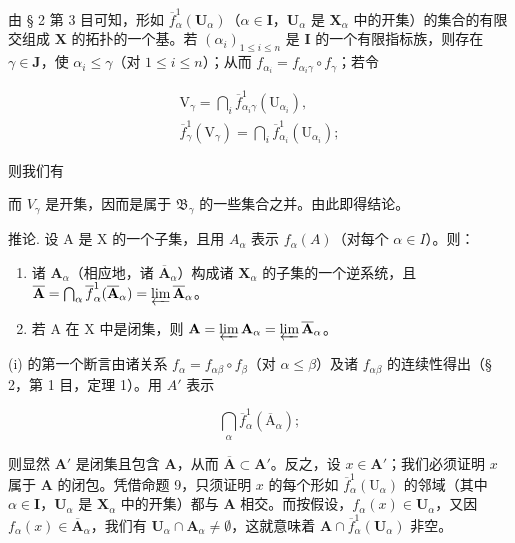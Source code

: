 由 § 2 第 3 目可知，形如 \(\overline{f}_{\alpha}^{1}(\mathbf{U}_{\alpha})\)（\(\alpha \in \mathbf{I}\)，\(\mathbf{U}_{\alpha}\) 是 \(\mathbf{X}_{\alpha}\) 中的开集）的集合的有限交组成 \(\mathbf{X}\) 的拓扑的一个基。若 \((\alpha_i)_{1 \leqslant i \leqslant n}\) 是 \(\mathbf{I}\) 的一个有限指标族，则存在 \(\gamma \in \mathbf{J}\)，使 \(\alpha_i \leqslant \gamma\)（对 \(1 \leqslant i \leqslant n\)）；从而 \(f_{\alpha_i} = f_{\alpha_i \gamma} \circ f_\gamma\)；若令

\[
\begin{array}{c} \mathrm{V} _ {\gamma} = \bigcap_ {i} \overline {{f}} _ {\alpha_ {i} \gamma} ^ {1} (\mathrm{U} _ {\alpha_ {i}}), \\ \overline {{f}} _ {\gamma} ^ {1} (\mathrm{V} _ {\gamma}) = \bigcap_ {i} \overline {{f}} _ {\alpha_ {i}} ^ {1} (\mathrm{U} _ {\alpha_ {i}}); \end{array}
\]

则我们有

而 \(V_{\gamma}\) 是开集，因而是属于 \(\mathfrak{B}_{\gamma}\) 的一些集合之并。由此即得结论。

推论. 设 A 是 X 的一个子集，且用 \(A_{\alpha}\) 表示 \(f_{\alpha}(A)\)（对每个 \(\alpha \in I\)）。则：

\begin{enumerate}
\def\labelenumi{(\roman{enumi})}
\item
  诸 \(\mathbf{A}_{\alpha}\)（相应地，诸 \(\overline{\mathbf{A}}_{\alpha}\)）构成诸 \(\mathbf{X}_{\alpha}\) 的子集的一个逆系统，且 \(\overline{\mathbf{A}} = \bigcap_{\alpha} \overline{f}_{\alpha}^{1}(\overline{\mathbf{A}}_{\alpha}) = \varprojlim \overline{\mathbf{A}}_{\alpha}\)。
\item
  若 A 在 X 中是闭集，则 \(\mathbf{A} = \varprojlim \mathbf{A}_{\alpha} = \varprojlim \overline{\mathbf{A}}_{\alpha}\)。
\end{enumerate}

(i) 的第一个断言由诸关系 \(f_{\alpha} = f_{\alpha \beta} \circ f_{\beta}\)（对 \(\alpha \leqslant \beta\)）及诸 \(f_{\alpha \beta}\) 的连续性得出（§ 2，第 1 目，定理 1）。用 \(A'\) 表示

\[
\bigcap_ {\alpha} \overline {{f}} _ {\alpha} ^ {1} (\overline {{\mathrm{A}}} _ {\alpha});
\]

则显然 \(\mathbf{A}'\) 是闭集且包含 \(\mathbf{A}\)，从而 \(\overline{\mathbf{A}} \subset \mathbf{A}'\)。反之，设 \(x \in \mathbf{A}'\)；我们必须证明 \(x\) 属于 \(\mathbf{A}\) 的闭包。凭借命题 9，只须证明 \(x\) 的每个形如 \(\overline{f}_{\alpha}^{1}(\mathrm{U}_{\alpha})\) 的邻域（其中 \(\alpha \in \mathbf{I}\)，\(\mathbf{U}_{\alpha}\) 是 \(\mathbf{X}_{\alpha}\) 中的开集）都与 \(\mathbf{A}\) 相交。而按假设，\(f_{\alpha}(x) \in \mathbf{U}_{\alpha}\)，又因 \(f_{\alpha}(x) \in \overline{\mathbf{A}}_{\alpha}\)，我们有 \(\mathbf{U}_{\alpha} \cap \mathbf{A}_{\alpha} \neq \emptyset\)，这就意味着 \(\mathbf{A} \cap \overline{f}_{\alpha}^{1}(\mathbf{U}_{\alpha})\) 非空。

